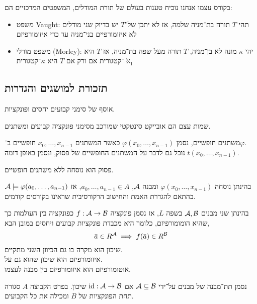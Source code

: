 בקורס עצמו אנחנו נוכיח טענות בעולם של תורת המודלים, המשפטים המרכזיים הם:
\begin{itemize}
	\item משפט Vaught: תהי $T$ תורה בת־מניה שלמה, אז לא יתכן של־$T$ יש בדיוק שני מודלים לא איזומורפיים בני־מניה עד כדי איזומורפיזם
	\item משפט מורלי (Morley): יהי $\kappa$ מונה לא בן־מניה, $T$ תורה מעל שפה בת־מניה, אז $T$ היא $\aleph_1$־קטגורית אם ורק אם $T$ היא $\kappa$־קטגורית
\end{itemize}

\subsection{תזכורת למושגים והגדרות}
\begin{definition}[שפה]
	אוסף של סימני קבועים יחסים ופונקציות.
\end{definition}
\begin{definition}
	שמות עצם הם אובייקט סינטקטי שמורכב מסימני פונקציה קבועים ומשתנים.
\end{definition}
\begin{definition}
	משתנים חופשיים, נסמן $\varphi(x_0, \ldots, x_{n - 1})$ כאשר המשתנים $x_0, \ldots, x_{n - 1}$ חופשיים ב־$\varphi$. \\
	נוכל גם לדבר על המשתנים החופשיים של פסוק, ונסמן באופן דומה $t(x_0, \ldots, x_{n - 1})$.
\end{definition}
\begin{definition}[פסוק]
	פסוק הוא נוסחה ללא משתנים חופשיים.
\end{definition}
\begin{definition}[השמה]
	בהינתן נוסחה $\varphi(x_0, \ldots, x_{n - 1})$ ומבנה $\mathcal{A}$, $a_0, \ldots, a_{n - 1} \in A$,
	אז $\mathcal{A} \models \varphi(a_0, \ldots, a_{n - 1})$ בהתאם להגדרת האמת והחישוב הרקורסיבית שראינו בקורסים קודמים.
\end{definition}
\begin{definition}
	בהינתן שני מבנים $\mathcal{A}, \mathcal{B}$ בשפה $L$, אז נסמן פונקציה $f : \mathcal{A} \to \mathcal{B}$ כפונקציה בין העולמות כך שהיא הומומורפיזם,
	כלומר היא מכבדת פונקציות קבועים ויחסים במובן הבא,
	\[
		\bar{a} \in R^{\mathcal{A}}
		\implies f(\bar{a}) \in R^{\mathcal{B}}
	\]
	שיכון הוא מקרה בו גם הכיוון השני מתקיים. \\
	איזומורפיזם הוא שיכון שהוא גם על. \\
	אוטומורפיזם הוא איזומורפיזם בין מבנה לעצמו.
\end{definition}
\begin{definition}[תת־מבנה]
	נסמן תת־מבנה של מבנים על־ידי $\mathcal{A} \subseteq \mathcal{B}$ אם $\operatorname{id} : \mathcal{A} \to \mathcal{B}$ שיכון.
	בפרט הקבוצה $A$ סגורה תחת הפונקציות של $B$ ומכילה את כל הקבועים.
\end{definition}
